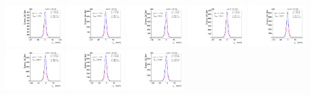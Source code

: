 \begin{figure}[htb]
\ContinuedFloat
\centering
\includegraphics[width=0.19\textwidth]{plots/Appendix_Recoil_Fits/WmpMC_PF_13TeV_2G/pfu1fit_0.pdf}
\includegraphics[width=0.19\textwidth]{plots/Appendix_Recoil_Fits/WmpMC_PF_13TeV_2G/pfu1fit_1.pdf}
\includegraphics[width=0.19\textwidth]{plots/Appendix_Recoil_Fits/WmpMC_PF_13TeV_2G/pfu1fit_2.pdf}
\includegraphics[width=0.19\textwidth]{plots/Appendix_Recoil_Fits/WmpMC_PF_13TeV_2G/pfu1fit_3.pdf}
\includegraphics[width=0.19\textwidth]{plots/Appendix_Recoil_Fits/WmpMC_PF_13TeV_2G/pfu1fit_4.pdf}
\includegraphics[width=0.19\textwidth]{plots/Appendix_Recoil_Fits/WmpMC_PF_13TeV_2G/pfu1fit_5.pdf}
\includegraphics[width=0.19\textwidth]{plots/Appendix_Recoil_Fits/WmpMC_PF_13TeV_2G/pfu1fit_6.pdf}
\includegraphics[width=0.19\textwidth]{plots/Appendix_Recoil_Fits/WmpMC_PF_13TeV_2G/pfu1fit_7.pdf}

\end{figure}
